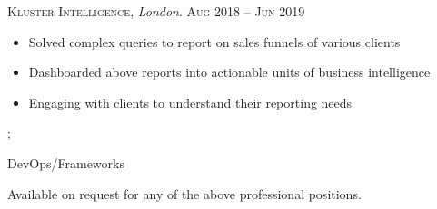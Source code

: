 \documentclass[a4paper]{limecv}
\begin{document}
\begin{cvMainContent}
\begin{cvExperience}
{        \textsc{\selectfont Kluster Intelligence}, \textit{London}. \hfill \textsc{Aug} 2018 -- \textsc{Jun} 2019\\
        \begin{itemize}
        \item Solved complex queries to report on sales funnels of various clients
        \item Dashboarded above reports into actionable units of business intelligence 
        \item Engaging with clients to understand their reporting needs
        \end{itemize}};
    \end{cvExperience}

    \begin{cvEducation}
    \end{cvEducation}
    
    \begin{cvSkills}


      DevOps/Frameworks
      

    \end{cvSkills}
  
    \begin{cvReferences}
      Available on request for any of the above professional positions.
    \end{cvReferences}
  
  \end{cvMainContent}
  
  
\end{document}
